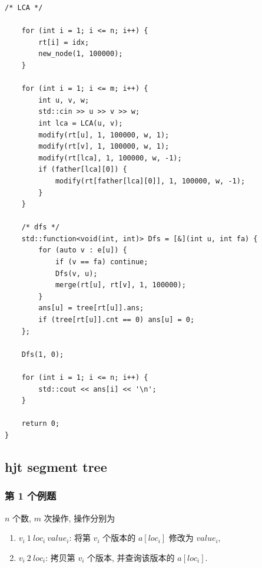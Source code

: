 \documentclass[UTF8, a4paper, titlepage, twoside]{ctexart}
\begin{document}
\begin{lstlisting}[style=cpp]
    /* LCA */

    for (int i = 1; i <= n; i++) {
        rt[i] = idx;
        new_node(1, 100000);
    }

    for (int i = 1; i <= m; i++) {
        int u, v, w;
        std::cin >> u >> v >> w;
        int lca = LCA(u, v);
        modify(rt[u], 1, 100000, w, 1);
        modify(rt[v], 1, 100000, w, 1);
        modify(rt[lca], 1, 100000, w, -1);
        if (father[lca][0]) {
            modify(rt[father[lca][0]], 1, 100000, w, -1);
        }
    }

    /* dfs */
    std::function<void(int, int)> Dfs = [&](int u, int fa) {
        for (auto v : e[u]) {
            if (v == fa) continue;
            Dfs(v, u);
            merge(rt[u], rt[v], 1, 100000);
        }
        ans[u] = tree[rt[u]].ans;
        if (tree[rt[u]].cnt == 0) ans[u] = 0;
    };

    Dfs(1, 0);

    for (int i = 1; i <= n; i++) {
        std::cout << ans[i] << '\n';
    }

    return 0;
}
\end{lstlisting}

\subsection{ hjt segment tree }

\subsubsection*{ 第 1 个例题 }

\(n\) 个数, \(m\) 次操作, 操作分别为

\begin{enumerate}
	\item $v_i \ 1 \ loc_i \ value_i$: 将第 $v_i$ 个版本的 $a[loc_i]$ 修改为 $value_i$,
	\item $v_i \ 2 \ loc_i$: 拷贝第 $v_i$ 个版本, 并查询该版本的 $a[loc_i]$.
\end{enumerate}
\end{document}
